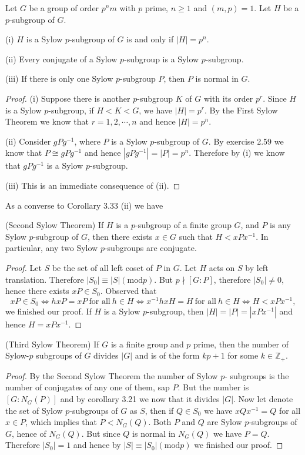 \begin{corollary}
Let $G$ be a group of order $p^nm$ with $p$ prime, $n\ge 1$ and $(m,p)=1$. Let $H$ be a $p$-subgroup of $G$.\par
(i) $H$ is a Sylow $p$-subgroup of $G$ is and only if $|H|=p^n$.\par
(ii) Every conjugate of a Sylow $p$-subgroup is a Sylow $p$-subgroup.\par
(iii) If there is only one Sylow $p$-subgroup $P$, then $P$ is normal in $G$.
\end{corollary}
\begin{proof}
(i) Suppose there is another $p$-subgroup $K$ of $G$ with its order $p^r$. Since $H$ is a Sylow $p$-subgroup, if $H<K<G$, we have $|H|=p^r$. By the First Sylow Theorem we know that $r=1,2,\cdots,n$ and hence $|H|=p^n$.\par
(ii) Consider $gPg^{-1}$, where $P$ is a Sylow $p$-subgroup of $G$. By exercise 2.59 we know that $P\cong gPg^{-1}$ and hence $|gPg^{-1}|=|P|=p^n$. Therefore by (i) we know that $gPg^{-1}$ is a Sylow $p$-subgroup.\par
(iii) This is an immediate consequence of (ii).
\end{proof}
As a converse to Corollary 3.33 (ii) we have 
\begin{theorem}(Second Sylow Theorem)
If $H$ is a $p$-subgroup of a finite group $G$, and $P$ is any Sylow $p$-subgroup of $G$, then there exists $x\in G$ such that $H<xPx^{-1}$. In particular, any two Sylow $p$-subgroups are conjugate.
\end{theorem}
\begin{proof}
Let $S$ be the set of all left coset of $P$ in $G$. Let $H$ acts on $S$ by left translation. Therefore $|S_0|\equiv|S|(\mathrm{mod}p)$. But $p\nmid[G:P]$, therefore $|S_0|\ne 0$, hence there exists $xP\in S_0$. Observed that 
$$xP\in S_0\Leftrightarrow hxP=xP\ \text{for all}\ h\in H\Leftrightarrow x^{-1}hxH=H\ \text{for all}\ h\in H\Leftrightarrow H<xPx^{-1},$$
we finished our proof. If $H$ is a Sylow $p$-subgroup, then $|H|=|P|=|xPx^{-1}|$ and hence $H=xPx^{-1}$.
\end{proof}
\begin{theorem}(Third Sylow Theorem)
If $G$ is a finite group and $p$ prime, then the number of Sylow-$p$ subgroups of $G$ divides $|G|$ and is of the form $kp+1$ for some $k\in\mathbb{Z}_+$.
\end{theorem}
\begin{proof}
By the Second Sylow Theorem the number of Sylow $p$- subgroups is the number of conjugates of any one of them, sap $P$. But the number is $[G:N_G(P)]$ and by corollary 3.21 we now that it divides $|G|$. Now let denote the set of Sylow $p$-subgroups of $G$ as $S$, then if $Q\in S_0$ we have $xQx^{-1}=Q$ for all $x\in P$, which implies that $P<N_G(Q)$. Both $P$ and $Q$ are Sylow $p$-subgroups of $G$, hence of $N_G(Q)$. But since $Q$ is normal in $N_G(Q)$ we have $P=Q$. Therefore $|S_0|=1$ and hence by $|S|\equiv|S_0|(\mathrm{mod}p)$ we finished our proof.
\end{proof}
